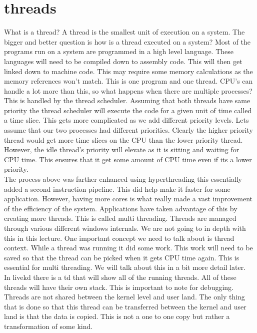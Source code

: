 \documentclass[letterpaper, onecolumn,10pt]{IEEEtran}
\begin{document}
		    \section{threads}
		    What is a thread? A thread is the smallest unit of execution on a system. The bigger and better question is how is a thread executed on a system? Most of the programs run on a system are programmed in a high level language. These languages will need to be compiled down to assembly code. This will then get linked down to machine code. This may require some memory calculations as the memory references won't match. This is one program and one thread. CPU's can handle a lot more than this, so what happens when there are multiple processes? This is handled by the thread scheduler. Assuming that both threads have same priority the thread scheduler will execute the code for a given unit of time called a time slice. This gets more complicated as we add different priority levels. Lets assume that our two processes had different priorities. Clearly the higher priority thread would get more time slices on the CPU than the lower priority thread. However, the idle thread's priority will elevate as it is sitting and waiting for CPU time. This ensures that it get some amount of CPU time even if its a lower priority.\\
		    
		    The process above was farther enhanced using hyperthreading this essentially added a second instruction pipeline. This did help make it faster for some application. However, having more cores is what really made a vast improvement of the efficiency of the system. Applications have taken advantage of this by creating more threads. This is called multi threading. Threads are managed through various different windows internals. We are not going to in depth with this in this lecture. One important concept we need to talk about is thread context. While a thread was running it did some work. This work will need to be saved so that the thread can be picked when it gets CPU time again. This is essential for multi threading. We will talk about this in a bit more detail later.\\
		    
		    In livekd there is a td that will show all of the running threads. All of these threads will have their own stack. This is important to note for debugging. Threads are not shared between the kernel level and user land. The only thing that is done so that this thread can be transferred between the kernel and user land is that the data is copied. This is not a one to one copy but rather a transformation of some kind.\\
		    
\end{document}
